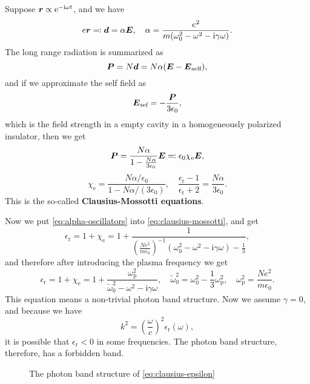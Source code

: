 \documentclass[hyperref, a4paper]{article}
\newcommand*{\ii}{\mathrm{i}}
\newcommand*{\ee}{\mathrm{e}}
\newcommand*{\concept}[1]{{\textbf{#1}}}
\begin{document}
Suppose $\vb*{r} \propto \ee^{- \ii \omega t}$, and we have 
\begin{equation}
    e\vb*{r} \eqqcolon \vb*{d} = \alpha \vb*{E}, \quad \alpha = \frac{e^2}{m (\omega_0^2 - \omega^2 - \ii \gamma \omega)}.
    \label{eq:alpha-oscillators}
\end{equation}
The long range radiation is summarized as 
\begin{equation}
    \vb*{P} = N \vb*{d} = N \alpha (\vb*{E} - \vb*{E}_\text{self}),
\end{equation}
and if we approximate the self field as 
\begin{equation}
    \vb*{E}_\text{sef} = - \frac{\vb*{P}}{3 \epsilon_0},
\end{equation}
which is the field strength in a empty cavity in a homogeneously polarized insulator, then we get 
\begin{equation}
    \vb*{P} = \frac{N \alpha}{1 - \frac{N \alpha}{3 \epsilon_0}} \vb*{E} \eqqcolon \epsilon_0 \chi_\text{e} \vb*{E},
\end{equation}
\begin{equation}
    \chi_\text{e} = \frac{N \alpha / \epsilon_0}{1 - N \alpha / (3 \epsilon_0)}, \quad \frac{\epsilon_\text{r} - 1}{\epsilon_\text{r} + 2} = \frac{N \alpha}{3 \epsilon_0}.
    \label{eq:clausius-mossotti}
\end{equation}
This is the so-called \concept{Clausius-Mossotti equations}.

Now we put \eqref{eq:alpha-oscillators} into \eqref{eq:clausius-mossotti}, and get 
\[
    \epsilon_\text{r} = 1 + \chi_\text{e} = 1 + \frac{1}{\left(\frac{N e^2}{m \epsilon_0}\right)^{-1} (\omega_0^2 - \omega^2 - \ii \gamma \omega) - \frac{1}{3}}, 
\]
and therefore after introducing the plasma frequency we get 
\begin{equation}
    \epsilon_\text{r} = 1 + \chi_\text{e} = 1 + \frac{\omega_\text{p}^2}{\tilde{\omega}_0^2 - \omega^2 - \ii \gamma \omega}, \quad \tilde{\omega}_0^2 = \omega_0^2 - \frac{1}{3} \omega_\text{p}^2, \quad \omega_\text{p}^2 = \frac{N e^2}{m \epsilon_0}.
    \label{eq:clausius-epsilon}
\end{equation}
This equation means a non-trivial photon band structure. Now we assume $\gamma = 0$, and because we have 
\begin{equation}
    k^2 = \left(\frac{\omega}{c}\right)^2 \epsilon_\text{r}(\omega),
\end{equation}
it is possible that $\epsilon_\text{r} < 0$ in some frequencies. The photon band structure, therefore, has 
a forbidden band. 

\begin{figure}
    \centering
    
    \caption{The photon band structure of \eqref{eq:clausius-epsilon}}
\end{figure}
\end{document}

